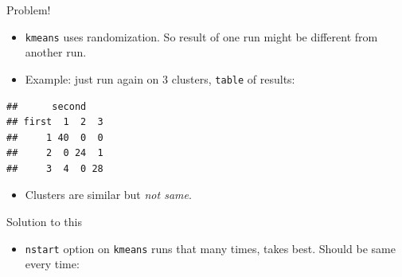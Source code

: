 \documentclass[ignorenonframetext,]{beamer}
\newenvironment{Shaded}{\begin{snugshade}}{\end{snugshade}}
\newcommand{\DataTypeTok}[1]{\textcolor[rgb]{0.13,0.29,0.53}{#1}}
\newcommand{\DecValTok}[1]{\textcolor[rgb]{0.00,0.00,0.81}{#1}}
\newcommand{\KeywordTok}[1]{\textcolor[rgb]{0.13,0.29,0.53}{\textbf{#1}}}
\newcommand{\NormalTok}[1]{#1}
\newcommand{\OperatorTok}[1]{\textcolor[rgb]{0.81,0.36,0.00}{\textbf{#1}}}
\newcommand{\StringTok}[1]{\textcolor[rgb]{0.31,0.60,0.02}{#1}}
\providecommand{\tightlist}{%
  \setlength{\itemsep}{0pt}\setlength{\parskip}{0pt}}
\begin{document}
\begin{frame}[fragile]{Problem!}
\protect\hypertarget{problem}{}

\begin{itemize}
\item
  \texttt{kmeans} uses randomization. So result of one run might be
  different from another run.
\item
  Example: just run again on 3 clusters, \texttt{table} of results:
\end{itemize}

\small

\begin{Shaded}
\end{Shaded}

\begin{verbatim}
##      second
## first  1  2  3
##     1 40  0  0
##     2  0 24  1
##     3  4  0 28
\end{verbatim}

\normalsize

\begin{itemize}
\tightlist
\item
  Clusters are similar but \emph{not same}.
\end{itemize}

\end{frame}

\begin{frame}[fragile]{Solution to this}
\protect\hypertarget{solution-to-this}{}

\begin{itemize}
\tightlist
\item
  \texttt{nstart} option on \texttt{kmeans} runs that many times, takes
  best. Should be same every time:
\end{itemize}

\small

\begin{Shaded}
\end{Shaded}

\normalsize

\end{frame}
\end{document}
